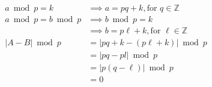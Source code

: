\documentclass[preview]{standalone}
\begin{document}
\begin{align*}
\
            a \bmod p = k &\implies a = pq + k, \text{for } q \in \mathbb{Z} \\ \
                a\bmod p = b \bmod p &\implies b \bmod p = k\\ \
                &\implies b = p\ell + k, \text{for }\ell \in \mathbb{Z} \\ \
                |A - B| \bmod p &= |pq + k - (p\ell + k)| \bmod p \\ \
                &= |pq - pl| \bmod p \\ \
                &= |p(q - \ell)| \bmod p \\ \
                &\boxed{=0} \\ \
\end{align*}
\end{document}
